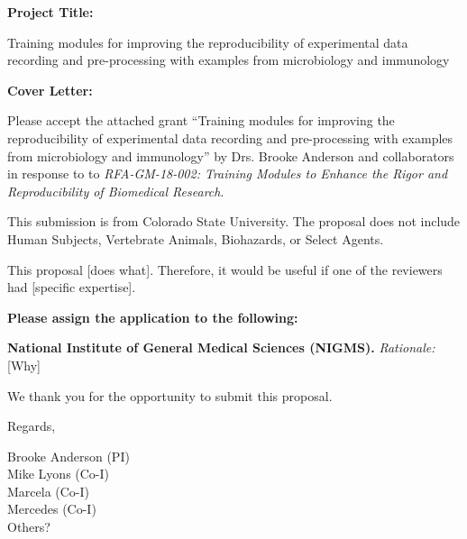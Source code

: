 \documentclass[pdftex,english,12pt,parskip=half]{scrartcl}
\begin{document}
\def\bf{\normalfont\bfseries}
\pagestyle{empty}


{\large \textbf{Project Title:}}

Training modules for improving the reproducibility of experimental data recording and pre-processing with examples from microbiology and immunology

\clearpage


{\large \textbf{Cover Letter:}}

Please accept the attached grant ``Training modules for improving the reproducibility of experimental data recording and pre-processing with examples from microbiology and immunology'' by Drs. Brooke Anderson and collaborators in response to to \textit{RFA-GM-18-002: Training Modules to Enhance the Rigor and Reproducibility of Biomedical Research}.

\vspace{0.1in}

This submission is from Colorado State University. The proposal does not include Human Subjects, Vertebrate Animals, Biohazards, or Select Agents.

\vspace{0.1in}

This proposal [does what]. Therefore, it would be useful if one of the reviewers had [specific expertise]. 

\vspace{0.1in}

\noindent \textbf{Please assign the application to the following:}
\begin{description}
 \item \textbf{National Institute of General Medical Sciences (NIGMS).} 
   \textit{Rationale:} [Why]  
 \end{description}

\vspace{0.1in}

We thank you for the opportunity to submit this proposal. 

\vspace{0.2in}

Regards, 

\vspace{0.8in}

Brooke Anderson (PI) \\
Mike Lyons (Co-I) \\
Marcela (Co-I) \\
Mercedes (Co-I) \\
Others?
\end{document}
